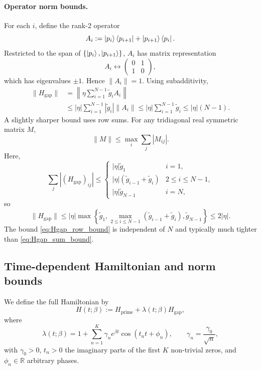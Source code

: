 \documentclass[11pt]{article}
\begin{document}
\paragraph{Operator norm bounds.}
For each $i$, define the rank-2 operator
\[
A_i := \ket{p_i}\bra{p_{i+1}} + \ket{p_{i+1}}\bra{p_i}.
\]
Restricted to the span of $\{\ket{p_i},\ket{p_{i+1}}\}$, $A_i$ has matrix representation
\[
A_i \leftrightarrow 
\begin{pmatrix}
0 & 1\\
1 & 0
\end{pmatrix},
\]
which has eigenvalues $\pm 1$. Hence $\|A_i\|=1$. Using subadditivity,
\begin{align}
\|H_{\mathrm{gap}}\|
&= \left\|\eta\sum_{i=1}^{N-1} \tilde g_i A_i\right\|\nonumber\\
&\leq |\eta|\sum_{i=1}^{N-1} |\tilde g_i| \|A_i\|
\leq |\eta|\sum_{i=1}^{N-1} \tilde g_i
\leq |\eta|(N-1).\label{eq:Hgap_sum_bound}
\end{align}
A slightly sharper bound uses row sums. For any tridiagonal real symmetric matrix $M$,
\[
\|M\| \leq \max_i \sum_j |M_{ij}|.
\]
Here,
\[
\sum_j |(H_{\mathrm{gap}})_{ij}| \leq
\begin{cases}
|\eta|\tilde g_{1} & i=1,\\
|\eta|(\tilde g_{i-1}+\tilde g_i) & 2\le i\le N-1,\\
|\eta|\tilde g_{N-1} & i=N,
\end{cases}
\]
so
\begin{equation}
\|H_{\mathrm{gap}}\| \leq |\eta|\max\left\{\tilde g_1,\max_{2\leq i\leq N-1}(\tilde g_{i-1}+\tilde g_i),\tilde g_{N-1}\right\} \leq 2|\eta|.\label{eq:Hgap_row_bound}
\end{equation}
The bound \eqref{eq:Hgap_row_bound} is independent of $N$ and typically much tighter than \eqref{eq:Hgap_sum_bound}.

\subsection{Time-dependent Hamiltonian and norm bounds}

We define the full Hamiltonian by
\begin{equation}
H(t;\beta) := H_{\mathrm{prime}} + \lambda(t;\beta) H_{\mathrm{gap}},
\end{equation}
where
\begin{equation}
\lambda(t;\beta) = 1 + \sum_{n=1}^K \gamma_n e^{\beta t}\cos(t_n t + \phi_n),
\qquad \gamma_n = \frac{\gamma_0}{\sqrt{n}},
\end{equation}
with $\gamma_0>0$, $t_n>0$ the imaginary parts of the first $K$ non-trivial zeros, and $\phi_n\in\mathbb{R}$ arbitrary phases.
\end{document}
